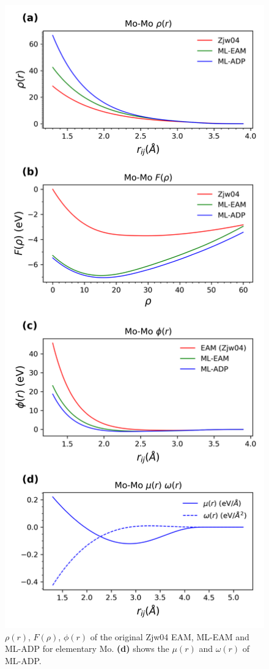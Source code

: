 \documentclass[final,3p,times]{elsarticle}
\begin{document}
% 
%
\begin{figure}[htp]
\centering
\includegraphics[scale=0.6]{Mo_eam_adp.png}
\caption{\label{fig:Mo_eam_adp} $\rho(r)$, $F(\rho)$, $\phi(r)$ of the original 
Zjw04 EAM, ML-EAM and ML-ADP for elementary Mo. \textbf{(d)} shows the $\mu(r)$ 
and $\omega(r)$ of ML-ADP.}
\end{figure}
\end{document}
